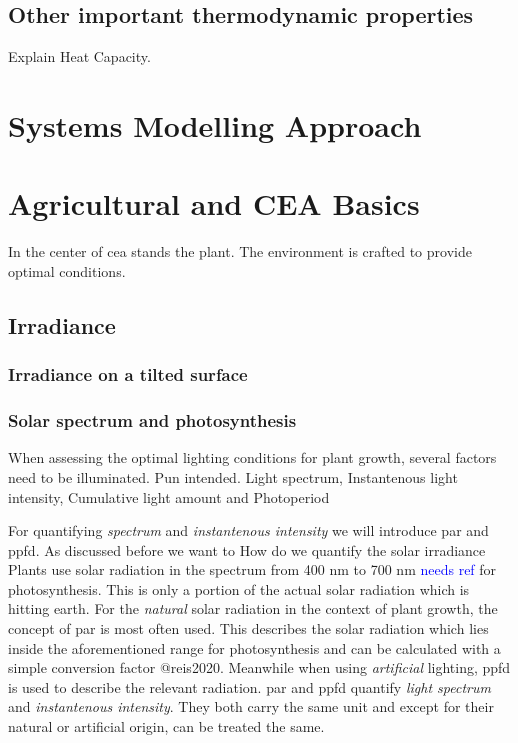\subsection{Other important thermodynamic properties}
\label{sub:ther-props}
Explain Heat Capacity.



\section{Systems Modelling Approach}

\section{Agricultural and CEA Basics}
In the center of \ac{cea} stands the plant.
The environment is crafted to provide optimal conditions.

\subsection{Irradiance}
\subsubsection{Irradiance on a tilted surface}

\subsubsection{Solar spectrum and photosynthesis}
When assessing the optimal lighting conditions for plant growth, several factors need to be illuminated.
Pun intended.
Light spectrum, Instantenous light intensity, Cumulative light amount and Photoperiod

For quantifying \textit{spectrum} and \textit{instantenous intensity} we will introduce \ac{par} and \ac{ppfd}.
As discussed before we want to 
How do we quantify the solar irradiance 
Plants use solar radiation in the spectrum from 400 nm to 700 nm \textcolor{blue}{needs ref} for photosynthesis.
This is only a portion of the actual solar radiation which is hitting earth.
For the \textit{natural} solar radiation in the context of plant growth, the concept of \ac{par} is most often used.
This describes the solar radiation which lies inside the aforementioned range for photosynthesis and can be calculated with a simple conversion factor @reis2020.
Meanwhile when using \textit{artificial} lighting, \ac{ppfd} is used to describe the relevant radiation.
\ac{par} and \ac{ppfd} quantify \textit{light spectrum} and \textit{instantenous intensity}.
They both carry the same unit and except for their natural or artificial origin, can be treated the same.


